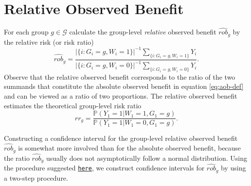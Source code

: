 \documentclass{article}
\begin{document}
\section{Relative Observed Benefit}
For each group $g \in \mathcal{G}$ calculate the group-level \textit{relative} observed benefit $\widehat{rob}_g$ by the relative risk (or risk ratio)
\begin{equation}
    \widehat{rob}_g = \frac{|\{ i : G_i = g, W_i = 1\}|^{-1} \sum_{\{ i : G_i = g, W_i = 1 \}} Y_i
    }{|\{ i : G_i = g, W_i = 0\}|^{-1} \sum_{\{ i : G_i = g, W_i = 0 \}} Y_i}.
\label{eq:rob-def}
\end{equation}
Observe that the relative observed benefit corresponds to the ratio of the two summands that constitute the absolute observed benefit in equation \eqref{eq:aob-def} and can be viewed as a ratio of two proportions. The relative observed benefit estimates the theoretical group-level risk ratio
\begin{equation}
    rr_g = \frac{\mathbb{P}(Y_1 = 1 | W_1 = 1, G_1 = g)}{\mathbb{P}(Y_1 = 1 | W_1 = 0, G_1 = g)}.
\label{eq:rr_g}
\end{equation}

Constructing a confidence interval for the group-level relative observed benefit $\widehat{rob}_g$ is somewhat more involved than for the absolute observed benefit, because the ratio $\widehat{rob}_g$ usually does not asymptotically follow a normal distribution. Using the procedure suggested \href{https://sphweb.bumc.bu.edu/otlt/mph-modules/bs/bs704_confidence_intervals/bs704_confidence_intervals8.html}{\texttt{here}}, we construct confidence intervals for $\widehat{rob}_g$ by using a two-step procedure.
\end{document}
